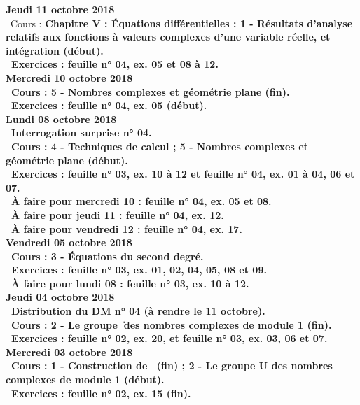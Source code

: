 \documentclass[12pt,a4paper]{article}
\begin{document}
\noindent\textbf{Jeudi 11 octobre 2018}\\
\bu\ Cours : \bf Chapitre V \rm : Équations différentielles : 1 - Résultats d'analyse relatifs aux fonctions à valeurs complexes d'une variable réelle, et intégration (début).\\
\bu\ Exercices : feuille n° 04, ex. 05 et 08 à 12.\vspace{.4cm}\\
 
\noindent\textbf{\bf Mercredi 10 octobre 2018}\\
\bu\ Cours : 5 - Nombres complexes et géométrie plane (fin).\\
\bu\ Exercices : feuille n° 04, ex. 05 (début).\vspace{.4cm}\\
 
\noindent\textbf{\bf Lundi 08 octobre 2018}\\
\bu\ Interrogation surprise n° 04.\\ 
\bu\ Cours : 4 - Techniques de calcul ; 5 - Nombres complexes et géométrie plane (début).\\
\bu\ Exercices : feuille n° 03, ex. 10 à 12 et feuille n° 04, ex. 01 à 04, 06 et 07.\\
\bu\ À faire pour mercredi 10 : feuille n° 04, ex. 05 et 08.\\
\bu\ À faire pour jeudi 11 : feuille n° 04, ex. 12.\\
\bu\ À faire pour vendredi 12 : feuille n° 04, ex. 17.\vspace{.4cm}\\
 
\noindent\textbf{Vendredi 05 octobre 2018}\\
\bu\ Cours : 3 - Équations du second degré.\\
\bu\ Exercices : feuille n° 03, ex. 01, 02, 04, 05, 08 et 09.\\
\bu\ À faire pour lundi 08 : feuille n° 03, ex. 10 à 12.\vspace{.4cm}\\
% 
\noindent\textbf{Jeudi 04 octobre 2018}\\
\bu\ Distribution du DM n° 04 (à rendre le 11 octobre).\\
\bu\ Cours : 2 - Le groupe \U\ des nombres complexes de module 1 (fin).
\bu\ Exercices : feuille n° 02, ex. 20, et feuille n° 03, ex. 03, 06 et 07.\vspace{.4cm}\\

\noindent\textbf{\bf Mercredi 03 octobre 2018}\\
\bu\ Cours : 1 - Construction de \C\ (fin) ; 2 - Le groupe \textbf{U} des nombres 
complexes de module 1 (début).\\
\bu\ Exercices : feuille n° 02, ex. 15 (fin).\vspace{.4cm}\\
\end{document}
